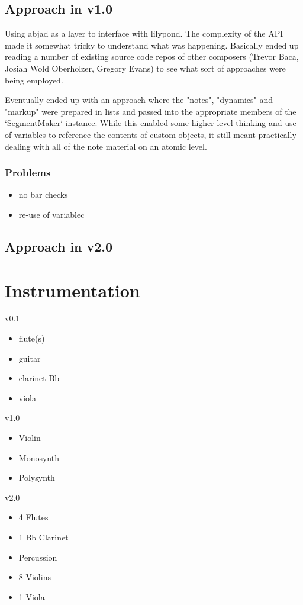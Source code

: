 \documentclass[11pt]{article}
\begin{document}
\subsection{Approach in v1.0}
\label{sec:org32777ea}
Using abjad as a layer to interface with lilypond. The complexity of
the API made it somewhat tricky to understand what was
happening. Basically ended up reading a number of existing source code
repos of other composers (Trevor Baca, Josiah Wold Oberholzer, Gregory
Evans) to see what sort of approaches were being employed. 

Eventually ended up with an approach where the "notes", "dynamics" and
"markup" were prepared in lists and passed into the appropriate
members of the `SegmentMaker` instance. While this enabled some higher
level thinking and use of variables to reference the contents of
custom objects, it still meant practically dealing with all of the
note material on an atomic level.

\subsubsection{Problems}
\label{sec:orge3632f4}
\begin{itemize}
\item no bar checks
\item re-use of variablec
\end{itemize}

\subsection{Approach in v2.0}
\label{sec:orgae85e7b}




\section{Instrumentation}
\label{sec:orgd1a0394}

v0.1
\begin{itemize}
\item flute(s)
\item guitar
\item clarinet Bb
\item viola
\end{itemize}

v1.0
\begin{itemize}
\item Violin
\item Monosynth
\item Polysynth
\end{itemize}

v2.0
\begin{itemize}
\item 4 Flutes
\item 1 Bb Clarinet
\item Percussion
\item 8 Violins
\item 1 Viola
\end{itemize}
\end{document}
